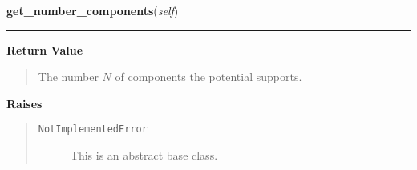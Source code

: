 \hspace{.8\funcindent}\begin{boxedminipage}{\funcwidth}

    \raggedright \textbf{get\_number\_components}(\textit{self})

    \vspace{-1.5ex}

    \rule{\textwidth}{0.5\fboxrule}
\setlength{\parskip}{2ex}
\setlength{\parskip}{1ex}
      \textbf{Return Value}
    \vspace{-1ex}

      \begin{quote}
      The number $N$ of components the potential supports.

      \end{quote}

      \textbf{Raises}
    \vspace{-1ex}

      \begin{quote}
        \begin{description}

          \item[\texttt{NotImplementedError}]

          This is an abstract base class.

        \end{description}

      \end{quote}

    \end{boxedminipage}

    \label{MatrixPotential:MatrixPotential:evaluate_at}

    \vspace{0.5ex}

